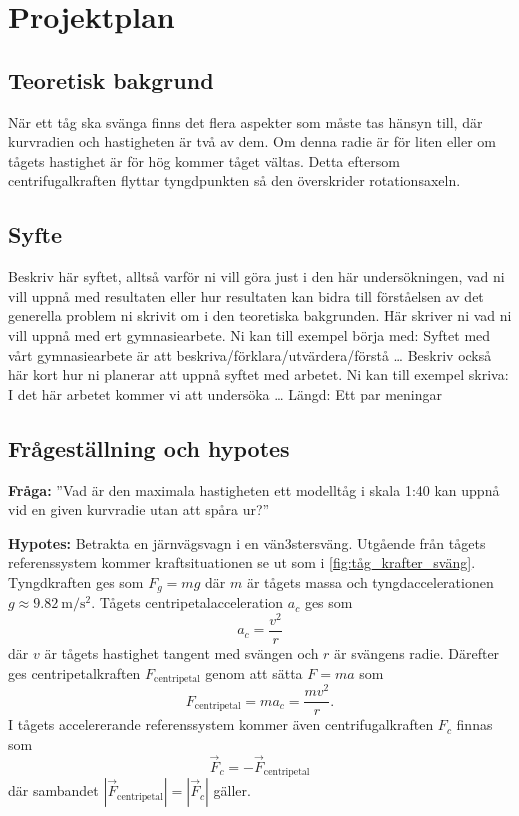 \section{Projektplan}
\subsection{Teoretisk bakgrund}
När ett tåg ska svänga finns det flera aspekter som måste tas hänsyn till, där kurvradien och hastigheten är två av dem. Om denna radie är för liten eller om tågets hastighet är för hög kommer tåget vältas. Detta eftersom centrifugalkraften flyttar tyngdpunkten så den överskrider rotationsaxeln.
\subsection{Syfte}
Beskriv här syftet, alltså varför ni vill göra just i den här undersökningen, vad ni vill uppnå med resultaten eller hur resultaten kan bidra till förståelsen av det generella problem ni skrivit om i den teoretiska bakgrunden. Här skriver ni vad ni vill uppnå med ert gymnasiearbete. Ni kan till exempel börja med: Syftet med vårt gymnasiearbete är att beskriva/förklara/utvärdera/förstå … Beskriv också här kort hur ni planerar att uppnå syftet med arbetet. Ni kan till exempel skriva: I det här arbetet kommer vi att undersöka …
Längd: Ett par meningar

\subsection{Frågeställning och hypotes}
\textbf{Fråga:} ''Vad är den maximala hastigheten ett modelltåg i skala 1:40 kan uppnå vid en given kurvradie utan att spåra ur?''

\textbf{Hypotes:} Betrakta en järnvägsvagn i en vän3stersväng. Utgående från tågets referenssystem kommer kraftsituationen se ut som i \cref{fig:tåg_krafter_sväng}. Tyngdkraften ges som $F_g = mg$ där $m$ är tågets massa och tyngdaccelerationen $g\approx \SI{9.82}{\m\per\s\squared}$. Tågets centripetalacceleration $a_c$ ges som
\begin{equation}
        a_c = \frac{v^2}{r}
\end{equation}
 där $v$ är tågets hastighet tangent med svängen och $r$ är svängens radie. Därefter ges centripetalkraften $F_\mathrm{centripetal}$ genom att sätta $F = ma$ som
 \begin{equation}
    F_\mathrm{centripetal} = ma_c = \frac{mv^2}{r}.
 \end{equation}
 I tågets accelererande referenssystem kommer även centrifugalkraften $F_c$ finnas som
 \begin{equation}
    \vec F_c = -\vec F_\mathrm{centripetal}
 \end{equation}
 där sambandet $|\vec F_\mathrm{centripetal}| = |\vec F_c|$ gäller.

